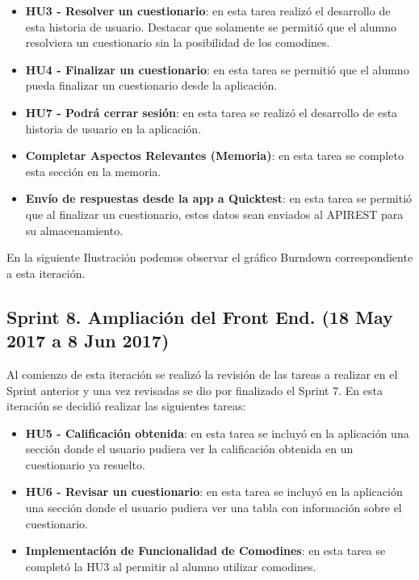 \begin{itemize}

	\item \textbf{HU3 - Resolver un cuestionario}: en esta tarea realizó el desarrollo de esta historia de usuario. Destacar que solamente se permitió que el alumno resolviera un cuestionario sin la posibilidad de los comodines.
	\item \textbf{HU4 - Finalizar un cuestionario}: en esta tarea se permitió que el alumno pueda finalizar un cuestionario desde la aplicación.
	\item \textbf{HU7 - Podrá cerrar sesión}: en esta tarea se realizó el desarrollo de esta historia de usuario en la aplicación.
	\item \textbf{Completar Aspectos Relevantes (Memoria)}: en esta tarea se completo esta sección en la memoria.
	\item \textbf{Envío de respuestas desde la app a Quicktest}: en esta tarea se permitió que al finalizar un cuestionario, estos datos sean enviados al APIREST para su almacenamiento.


\end{itemize}

En la siguiente Ilustración podemos observar el gráfico Burndown correspondiente a esta iteración.


\subsection{Sprint 8. Ampliación del Front End. (18 May 2017 a 8 Jun 2017)}

Al comienzo de esta iteración se realizó la revisión de las tareas a realizar en el Sprint anterior y una vez revisadas se dio por finalizado el Sprint 7. 
En esta iteración se decidió realizar las siguientes tareas:

\begin{itemize}

	\item \textbf{HU5 - Calificación obtenida}: en esta tarea se incluyó en la aplicación una sección donde el usuario pudiera ver la calificación obtenida en un cuestionario ya resuelto.
	\item \textbf{HU6 - Revisar un cuestionario}: en esta tarea se incluyó en la aplicación una sección donde el usuario pudiera ver una tabla con información sobre el cuestionario.
	\item \textbf{Implementación de Funcionalidad de Comodines}: en esta tarea se completó la HU3 al permitir al alumno utilizar comodines.


\end{itemize}

